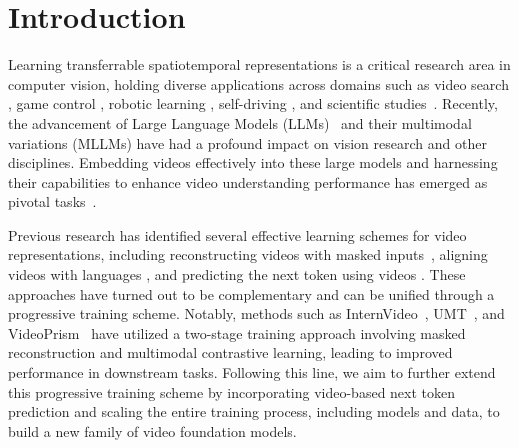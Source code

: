\section{Introduction} \label{sec:intro}

Learning transferrable spatiotemporal representations is a critical research area in computer vision, holding diverse applications across domains such as video search \cite{gabeur2020multi}, game control \cite{bruce2024genie}, robotic learning \cite{palme}, self-driving \cite{zablocki2022explainability}, and scientific studies~\cite{team2023gemini}. Recently, the advancement of Large Language Models (LLMs)~\cite{gpt3,gpt4,llama1,llama2} and their multimodal variations (MLLMs) \cite{gpt4v,mmgpt,llava,team2023gemini} have had a profound impact on vision research and other disciplines. Embedding videos effectively into these large models and harnessing their capabilities to enhance video understanding performance has emerged as pivotal tasks~\cite{li2023videochat,videochatgpt}.

Previous research has identified several effective learning schemes for video representations, including reconstructing videos with masked inputs~\cite{he2022masked,videomae,wang2023videomae,st_mae}, aligning videos with languages \cite{cpd,videoclip,videococa,umt}, and predicting the next token using videos \cite{flamingo,sun2023emu1,li2023mvbench}. These approaches have turned out to be complementary and can be unified through a progressive training scheme. Notably, methods such as InternVideo~\cite{wang2022internvideo}, UMT~\cite{umt}, and VideoPrism~\cite{videoprism} have utilized a two-stage training approach involving masked reconstruction and multimodal contrastive learning, leading to improved performance in downstream tasks. Following this line, we aim to further extend this progressive training scheme by incorporating video-based next token prediction and scaling the entire training process, including models and data, to build a new family of video foundation models. 

